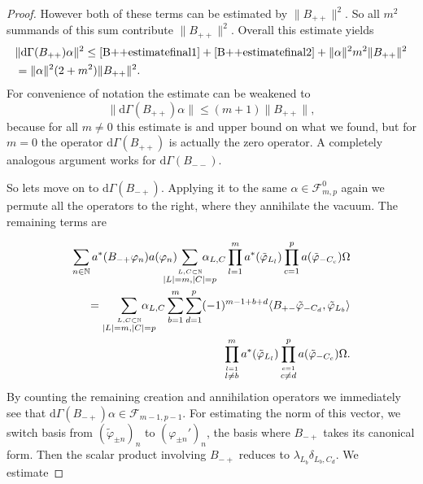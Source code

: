 \documentclass[b5paper,draft,openbib,12pt]{memoir}
\begin{document}
\begin{proof}
However both of these terms can be estimated by \(\|B_{++}\|^2\). So all \(m^2\) summands of this sum contribute \(\|B_{++}\|^2\). Overall 
this estimate yields
\begin{align}\nonumber
&\|\mathrm{d}\Gamma(B_{++})\alpha\|^2 \le \eqref{B++estimatefinal1}+\eqref{B++estimatefinal2} + \|\alpha\|^2 m^2 \|B_{++}\|^2 \\\nonumber
&= \|\alpha\|^2 (2+m^2) \|B_{++}\|^2.
\end{align}
For convenience of notation the estimate can be weakened to 
\begin{equation}
\|\mathrm{d}\Gamma(B_{++})\alpha\| \le (m+1) \|B_{++}\|,
\end{equation}
because for all \(m\neq0\) 
this estimate is and upper bound on what we found, but for \(m=0\) the operator \(\mathrm{d}\Gamma(B_{++})\) is actually the zero operator.
A completely analogous argument works for \(\mathrm{d}\Gamma(B_{--})\). 

So lets move on to \(\mathrm{d}\Gamma(B_{-+})\). Applying it to the same \(\alpha\in \mathcal{F}^0_{m,p}\) again we permute all the operators
to the right, where they annihilate the vacuum. The remaining terms are

\begin{align}\nonumber
\sum_{n\in\mathbb{N}} a^*(B_{-+}\varphi_n)a(\varphi_{n})\hspace{-0.5cm}\sum_{\overset{L,C\subset \mathbb{N}}{|L|=m,|C|=p}}  \hspace{-0.5cm}\alpha_{L,C} 
\prod_{l=1}^m a^*(\tilde{\varphi}_{L_l}) \prod_{c=1}^p a(\tilde{\varphi}_{-C_c}) \Omega  \\\nonumber
=\sum_{\overset{L,C\subset \mathbb{N}}{|L|=m,|C|=p}}\hspace{-0.5cm} \alpha_{L,C} \sum_{b=1}^m \sum_{d=1}^p (-1)^{m-1+b+d} \langle B_{+-} \tilde{\varphi}_{-C_d},\tilde{\varphi}_{L_b}\rangle \\
\prod_{\overset{l=1}{l\neq b}}^m a^*(\tilde{\varphi}_{L_l})
\prod_{\overset{c=1}{c\neq d}}^p a(\tilde{\varphi}_{-C_c})\Omega.
\end{align}
By counting the remaining creation and annihilation operators we immediately see that \(\mathrm{d}\Gamma(B_{-+})\alpha\in \mathcal{F}_{m-1,p-1}\). 
For estimating the norm of this vector, we switch basis from \((\tilde{\varphi}_{\pm n})_n\) to \((\varphi_{\pm n}')_n\), the basis where 
\(B_{-+}\) takes its canonical form. Then the scalar product involving \(B_{-+}\) reduces to \(\lambda_{L_b}\delta_{L_b,C_d}\). We estimate


\end{proof}
\end{document}
